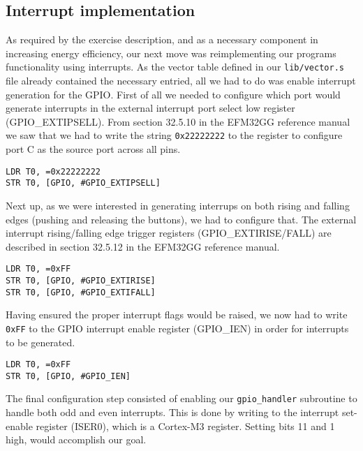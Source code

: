 \subsection{Interrupt implementation}
\label{sec:interrupt-implementation}

As required by the exercise description, and as a necessary component in increasing energy efficiency, our next move was reimplementing our programs functionality using interrupts. As the vector table defined in our \texttt{lib/vector.s} file already contained the necessary entried, all we had to do was enable interrupt generation for the GPIO. First of all we needed to configure which port would generate interrupts in the external interrupt port select low register (GPIO\_EXTIPSELL). From section 32.5.10 in the EFM32GG reference manual \cite{efm32ggref} we saw that we had to write the string \texttt{0x22222222} to the register to configure port C as the source port across all pins.

\begin{lstlisting}[label=interrupt-port-select, caption=Configuring GPIO\_EXTIPSELL]
LDR T0, =0x22222222
STR T0, [GPIO, #GPIO_EXTIPSELL]
\end{lstlisting}

Next up, as we were interested in generating interrups on both rising and falling edges (pushing and releasing the buttons), we had to configure that. The external interrupt rising/falling edge trigger registers (GPIO\_EXTIRISE/FALL) are described in section 32.5.12 in the EFM32GG reference manual. \cite{efm32ggref}

\begin{lstlisting}[label=gpio-edge-config, caption=Rising/falling edge]
LDR T0, =0xFF
STR T0, [GPIO, #GPIO_EXTIRISE]
STR T0, [GPIO, #GPIO_EXTIFALL]
\end{lstlisting}

Having ensured the proper interrupt flags would be raised, we now had to write \texttt{0xFF} to the GPIO interrupt enable register (GPIO\_IEN) in order for interrupts to be generated.

\begin{lstlisting}[label=gpio-ien-config, caption=Enable interrupts in GPIO\_IEN]
LDR T0, =0xFF
STR T0, [GPIO, #GPIO_IEN]
\end{lstlisting}

The final configuration step consisted of enabling our \texttt{gpio\_handler} subroutine to handle both odd and even interrupts. This is done by writing to the interrupt set-enable register (ISER0), which is a Cortex-M3 register. Setting bits 11 and 1 high, would accomplish our goal.

